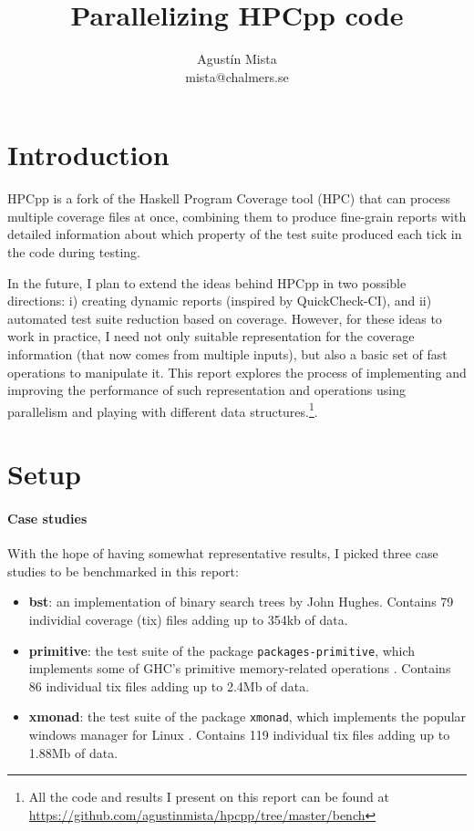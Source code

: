 \documentclass[a4paper,10pt]{article}
\begin{document}

\title{Parallelizing HPCpp code}
\author{Agust\'in Mista\\ mista@chalmers.se}
\date{}
\maketitle


\section*{Introduction}

HPCpp \cite{hpcpp} is a fork of the Haskell Program Coverage tool (HPC)
\cite{hpc} that can process multiple coverage files at once, combining them to
produce fine-grain reports with detailed information about which property of the
test suite produced each tick in the code during testing.

In the future, I plan to extend the ideas behind HPCpp in two possible
directions: i) creating dynamic reports (inspired by QuickCheck-CI), and ii)
automated test suite reduction based on coverage.
%
However, for these ideas to work in practice, I need not only suitable
representation for the coverage information (that now comes from multiple
inputs), but also a basic set of fast operations to manipulate it.
%
This report explores the process of implementing and improving the performance
of such representation and operations using parallelism and playing with
different data structures.\footnote{All the code and results I present on this
  report can be found at
  \url{https://github.com/agustinmista/hpcpp/tree/master/bench}}.

\section*{Setup}

\paragraph{Case studies}
With the hope of having somewhat representative results, I picked three case
studies to be benchmarked in this report:

\begin{itemize}
\item \textbf{bst}: an implementation of binary search trees by John Hughes.
  Contains 79 individial coverage (tix) files adding up to 354kb of data.
\item \textbf{primitive}: the test suite of the package
  \texttt{packages-primitive}, which implements some of GHC's primitive
  memory-related operations \cite{primitive}. Contains 86 individual tix files
  adding up to 2.4Mb of data.
\item \textbf{xmonad}: the test suite of the package \texttt{xmonad}, which
  implements the popular windows manager for Linux \cite{xmonad}. Contains 119
  individual tix files adding up to 1.88Mb of data.
\end{itemize}
\end{document}
